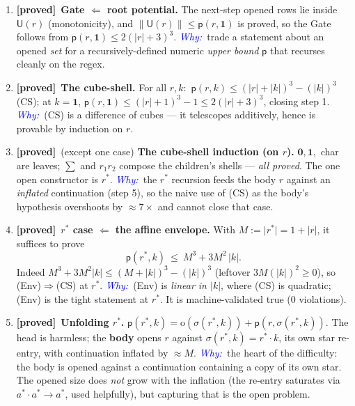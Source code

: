 \documentclass[11pt]{article}
\newcommand{\rs}[1]{\lvert #1\rvert}                 %
\newcommand{\rss}[1]{\lVert #1\rVert}                %
\newcommand{\sig}{\sigma}                            %
\newcommand{\opn}{\mathrm{o}}                        %
\newcommand{\pot}{\mathsf{p}}                        %
\newcommand{\SOL}{\mathsf{U}}                        %
\newcommand{\seq}{\cdot}
\newcommand{\one}{\mathbf 1}
\newcommand{\zero}{\mathbf 0}
\newcommand{\GREEN}{\textcolor{green!55!black}{\textbf{[proved]}}}
\newcommand{\WHY}{\textit{\textcolor{blue}{Why:\ }}}
\theoremstyle{definition}
\begin{document}
\begin{enumerate}[leftmargin=1.6em,itemsep=5pt]

\item \GREEN\ \textbf{Gate $\Leftarrow$ root potential.} The next-step opened rows lie inside $\SOL(r)$ (monotonicity),
and $\rss{\SOL(r)}\le\pot(r,\one)$ is proved, so the Gate follows from $\pot(r,\one)\le 2(\rs r+3)^3$.
\WHY trade a statement about an opened \emph{set} for a recursively-defined numeric \emph{upper bound} $\pot$ that
recurses cleanly on the regex.

\item \GREEN\ \textbf{The cube-shell.} For all $r,k$:\ $\pot(r,k)\le(\rs r+\rs k)^3-(\rs k)^3$ (CS); at $k=\one$,
$\pot(r,\one)\le(\rs r+1)^3-1\le2(\rs r+3)^3$, closing step 1.
\WHY (CS) is a difference of cubes --- it telescopes additively, hence is provable by induction on $r$.

\item \GREEN\ (except one case) \textbf{The cube-shell induction (on $r$).} $\zero,\one,$ char are leaves;
$\sum$ and $r_1r_2$ compose the children's shells --- \emph{all proved}. The one open constructor is $r^{*}$.
\WHY the $r^{*}$ recursion feeds the body $r$ against an \emph{inflated} continuation (step 5), so the naive use of (CS)
as the body's hypothesis overshoots by ${\approx}7\times$ and cannot close that case.

\item \GREEN\ \textbf{$r^{*}$ case $\Leftarrow$ the affine envelope.} With $M:=\rs{r^{*}}=1+\rs r$, it suffices to prove
\[
\pot(r^{*},k)\ \le\ M^3+3M^2\,\rs k.\tag{Env}
\]
Indeed $M^3+3M^2\rs k\le(M+\rs k)^3-(\rs k)^3$ (leftover $3M(\rs k)^2\ge0$), so (Env)$\Rightarrow$(CS) at $r^{*}$.
\WHY (Env) is \emph{linear in $\rs k$}, where (CS) is quadratic; (Env) is the tight statement at $r^{*}$. It is
machine-validated true ($0$ violations).

\item \GREEN\ \textbf{Unfolding $r^{*}$.} $\pot(r^{*},k)=\opn(\sig(r^{*},k))+\pot(r,\sig(r^{*},k))$. The head is harmless;
the \textbf{body} opens $r$ against $\sig(r^{*},k)=r^{*}\seq k$, its own star re-entry, with continuation inflated by ${\approx}M$.
\WHY the heart of the difficulty: the body is opened against a continuation containing a copy of its own star. The opened
size does \emph{not} grow with the inflation (the re-entry saturates via $a^{*}\seq a^{*}\to a^{*}$, used helpfully), but
capturing that is the open problem.


\end{enumerate}
\end{document}

